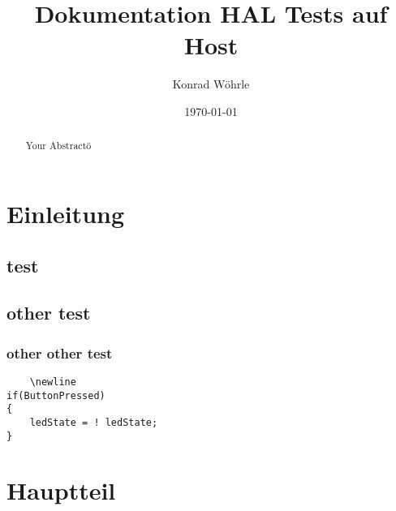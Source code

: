 \documentclass[12pt,a4paper]{article}
\title{Dokumentation HAL Tests auf Host}
\author{Konrad Wöhrle}
\date{\today}
\begin{document}
\maketitle
\tableofcontents
\newpage

\section{Einleitung}

\subsection{test}
\subsection{other test}
\subsubsection{other other test}

\begin{verbatim}
    \newline
if(ButtonPressed)
{
    ledState = ! ledState;
}
\end{verbatim}

\section{Hauptteil}

\section{}

\begin{abstract}
Your Abstractö
\end{abstract}
\end{document}
